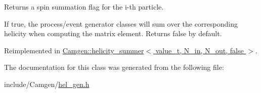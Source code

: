 Returns a spin summation flag for the i-\/th particle. 

If true, the process/event generator classes will sum over the corresponding helicity when computing the matrix element. Returns false by default. 

Reimplemented in \hyperlink{a00276_a919700d1b7e3d0fb241ec68ce89c234f}{Camgen\-::helicity\-\_\-summer$<$ value\-\_\-t, N\-\_\-in, N\-\_\-out, false $>$}.



The documentation for this class was generated from the following file\-:\begin{DoxyCompactItemize}
\item 
include/\-Camgen/\hyperlink{a00639}{hel\-\_\-gen.\-h}\end{DoxyCompactItemize}

